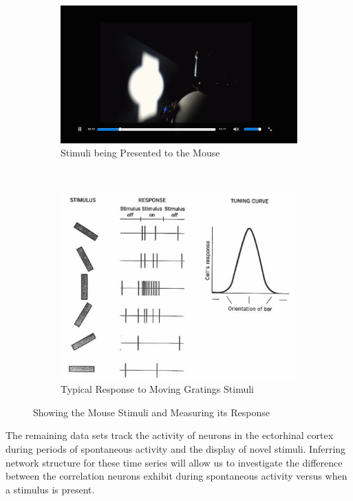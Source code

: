 \documentclass{article}
\begin{document}
\begin{figure}[ht]
  \centering

  \begin{subfigure}{0.45\textwidth}
    \includegraphics[width=\textwidth]{looming}
    \caption{Stimuli being Presented to the Mouse}
    \label{fig:setup}
  \end{subfigure}
  ~
  \begin{subfigure}{0.45\textwidth}
    \includegraphics[width=\textwidth]{moving_gratings}
    \caption{Typical Response to Moving Gratings Stimuli}
    \label{fig:tuning}
  \end{subfigure}

  \caption{Showing the Mouse Stimuli and Measuring its Response}
\end{figure}

The remaining data sets track the activity of neurons in the ectorhinal cortex 
during periods of spontaneous activity and the display of novel stimuli. 
Inferring network structure for these time series will allow us to investigate 
the difference between the correlation neurons exhibit during spontaneous 
activity versus when a stimulus is present. \par
\end{document}
